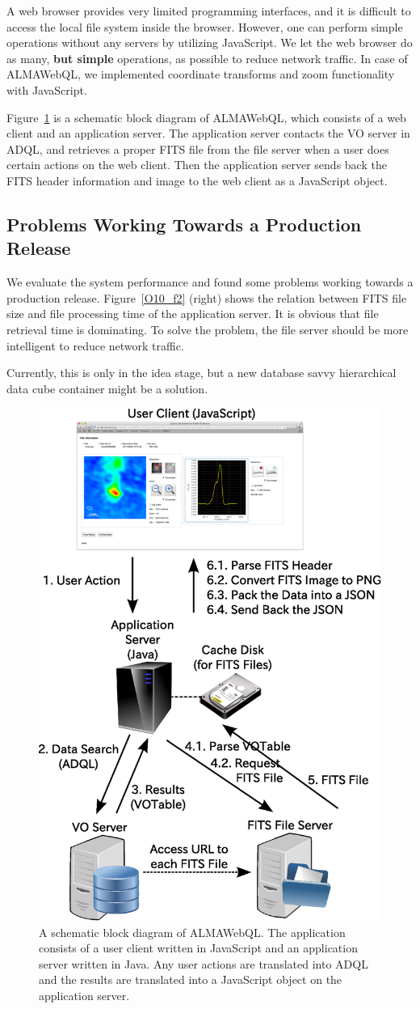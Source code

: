 A web browser provides very limited programming interfaces, and it is difficult to access the local file system inside the browser. However, one can perform simple operations without any servers by utilizing  JavaScript. We let the web browser do as many, {\bf but simple} operations, as possible to reduce network traffic. In case of ALMAWebQL, we implemented coordinate transforms and zoom functionality with JavaScript.

Figure~\ref{O10_f3} is a schematic block diagram of ALMAWebQL, which consists of a web client and an application server. The application server contacts the VO server in ADQL, and retrieves a proper FITS file from the file server when a user does certain actions on the web client. Then the application server sends back the FITS header information and image to the web client as a JavaScript object.

\subsection{Problems Working Towards a Production Release}

We evaluate the system performance and found some problems working towards a production release. Figure~\ref{O10_f2} (right) shows the relation between FITS file size and file processing time of the application server. It is obvious that file retrieval time is dominating. To solve the problem, the file server should be more intelligent to reduce network traffic.

Currently, this is only in the idea stage, but a new database savvy hierarchical data cube container might be a solution.


\begin{figure}[tbh]
	\begin{center}
		\includegraphics[keepaspectratio,width=0.54\hsize,clip]{part9/Eguchi_O10/O10_f3.eps}
	\end{center}
	\caption{A schematic block diagram of ALMAWebQL. The application consists of a user client written in JavaScript and an application server written in Java. Any user actions are translated into ADQL and the results are translated into a JavaScript object on the application
	server.\label{O10_f3}}
\end{figure}%

